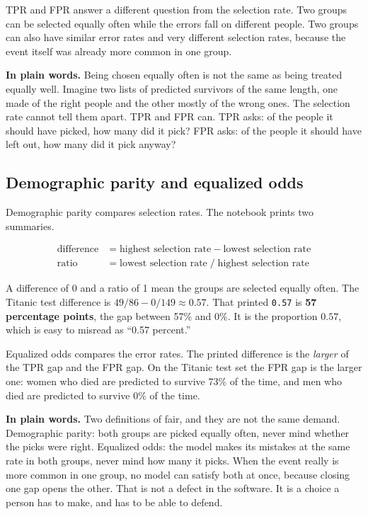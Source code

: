 \documentclass[11pt]{article}
\newcommand{\fn}[1]{\texttt{\small #1}}
\newcommand{\pct}[1]{\mbox{#1\%}}
\begin{document}
TPR and FPR answer a different question from the selection rate. Two groups can be selected equally often while the errors fall on different people. Two groups can also have similar error rates and very different selection rates, because the event itself was already more common in one group.

\begin{plainwords}
\textbf{In plain words.} Being chosen equally often is not the same as being treated equally well. Imagine two lists of predicted survivors of the same length, one made of the right people and the other mostly of the wrong ones. The selection rate cannot tell them apart. TPR and FPR can. TPR asks: of the people it should have picked, how many did it pick? FPR asks: of the people it should have left out, how many did it pick anyway?
\end{plainwords}

\subsection{Demographic parity and equalized odds}

Demographic parity compares selection rates. The notebook prints two summaries.

\[
\begin{aligned}
\text{difference} &= \text{highest selection rate} - \text{lowest selection rate} \\
\text{ratio} &= \text{lowest selection rate} \;/\; \text{highest selection rate}
\end{aligned}
\]

A difference of 0 and a ratio of 1 mean the groups are selected equally often. The Titanic test difference is \(49/86 - 0/149 \approx 0.57\). That printed \fn{0.57} is \textbf{57 percentage points}, the gap between \pct{57} and \pct{0}. It is the proportion \(0.57\), which is easy to misread as ``0.57 percent.''

Equalized odds compares the error rates. The printed difference is the \emph{larger} of the TPR gap and the FPR gap. On the Titanic test set the FPR gap is the larger one: women who died are predicted to survive \pct{73} of the time, and men who died are predicted to survive \pct{0} of the time.

\begin{plainwords}
\textbf{In plain words.} Two definitions of fair, and they are not the same demand. Demographic parity: both groups are picked equally often, never mind whether the picks were right. Equalized odds: the model makes its mistakes at the same rate in both groups, never mind how many it picks. When the event really is more common in one group, no model can satisfy both at once, because closing one gap opens the other. That is not a defect in the software. It is a choice a person has to make, and has to be able to defend.
\end{plainwords}
\end{document}
